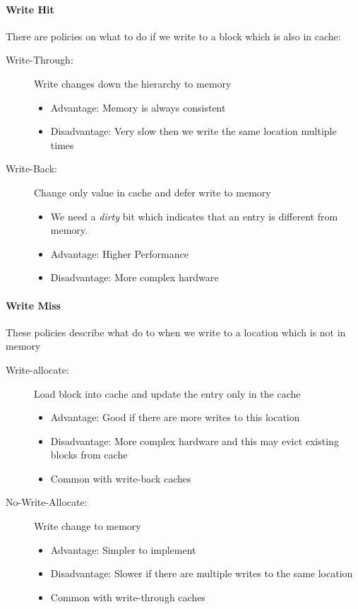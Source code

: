 \paragraph{Write Hit}
There are policies on what to do if we write to a block which is also in cache:

\begin{description}
    \item[Write-Through:] Write changes down the hierarchy to memory
        \begin{itemize}
            \item Advantage: Memory is always consistent
            \item Disadvantage: Very slow then we write the same location multiple times
        \end{itemize}
    \item[Write-Back:] Change only value in cache and defer write to memory 
        \begin{itemize}
            \item We need a \textit{dirty} bit which indicates that an entry is different from memory.
            \item Advantage: Higher Performance
            \item Disadvantage: More complex hardware
        \end{itemize}
\end{description}

\paragraph{Write Miss}
These policies describe what do to when we write to a location which is not in memory

\begin{description}
    \item[Write-allocate:] Load block into cache and update the entry only in the cache
        \begin{itemize}
            \item Advantage: Good if there are more writes to this location
            \item Disadvantage: More complex hardware and this may evict existing blocks from cache
            \item Common with write-back caches
        \end{itemize}
    \item[No-Write-Allocate:] Write change to memory
        \begin{itemize}
            \item Advantage: Simpler to implement
            \item Disadvantage: Slower if there are multiple writes to the same location
            \item Common with write-through caches
        \end{itemize}
\end{description}

